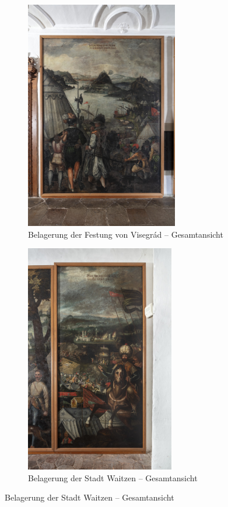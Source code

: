 \documentclass[
  a4paper,
]{book}
\begin{document}
\begin{figure}
\begin{figure}[H]    
  \includegraphics[height=10cm]{images/fmd10005840a.jpg}
  \caption{Belagerung der Festung von Visegrád – Gesamtansicht}
  \label{fig:{images/fmd10005840a.jpg}}
\end{figure}

\clearpage

\begin{figure}[H]    
  \includegraphics[height=10cm]{images/fmd10005842a.jpg}
  \caption{Belagerung der Stadt Waitzen – Gesamtansicht}
  \label{fig:{images/fmd10005842a.jpg}}
\end{figure}

\clearpage


\end{figure}
\end{document}
